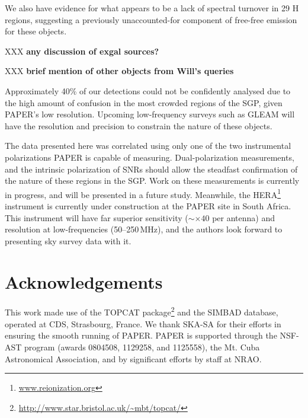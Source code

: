 \documentclass[useAMS,usenatbib]{mn2e}
\begin{document}
We also have evidence for what appears to be a lack of spectral turnover in 29 {H} regions, suggesting a previously unaccounted-for component of free-free emission for these objects.

XXX {\bf any discussion of exgal sources?}

XXX {\bf brief mention of other objects from Will's queries}

Approximately 40\% of our detections could not be confidently analysed due to the high amount of confusion in the most crowded regions of the SGP, given PAPER's low resolution. Upcoming low-frequency surveys such as GLEAM will have the resolution and precision to constrain the nature of these objects.

The data presented here was correlated using only one of the two instrumental polarizations PAPER is capable of measuring. Dual-polarization measurements, and the intrinsic polarization of SNRs \citep[e.g.][]{Gao_v.11} should allow the steadfast confirmation of the nature of these regions in the SGP. Work on these measurements is currently in progress, and will be presented in a future study. Meanwhile, the HERA\footnote{\url{www.reionization.org}} instrument is currently under construction at the PAPER site in South Africa. This instrument will have far superior sensitivity ($\sim\times40$ per antenna) and resolution at low-frequencies (50--250\,MHz), and the authors look forward to presenting sky survey data with it.

\section*{Acknowledgements}
This work made use of the TOPCAT package\footnote{\url{http://www.star.bristol.ac.uk/~mbt/topcat/}} and the SIMBAD database, operated at CDS, Strasbourg, France.
We thank SKA-SA for their efforts in ensuring the smooth running of PAPER. PAPER is supported through the NSF-AST program (awards 0804508, 1129258, and 1125558), the Mt. Cuba Astronomical Association, and by significant efforts by staff at NRAO. 


{}
\end{document}
